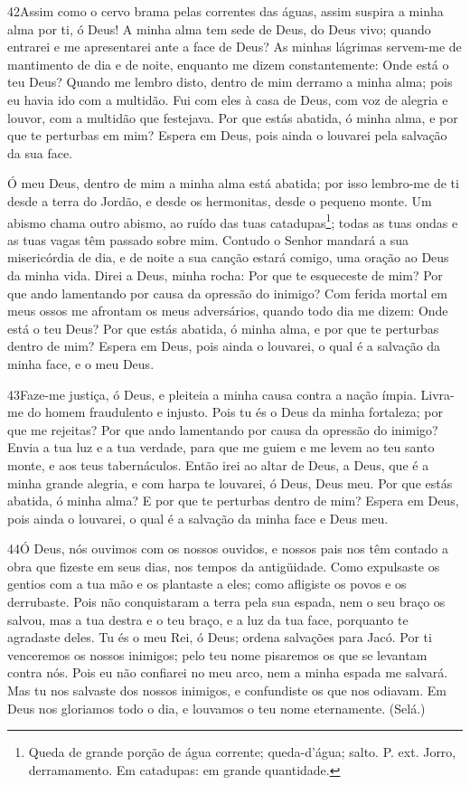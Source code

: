 \bigskip

\lettrine{42}{}Assim como o cervo brama pelas correntes das
águas, assim suspira a minha alma por ti, ó Deus! A minha alma
tem sede de Deus, do Deus vivo; quando entrarei e me apresentarei
ante a face de Deus? As minhas lágrimas servem-me de mantimento
de dia e de noite, enquanto me dizem constantemente: Onde está o teu
Deus? Quando me lembro disto, dentro de mim derramo a minha
alma; pois eu havia ido com a multidão. Fui com eles à casa de Deus,
com voz de alegria e louvor, com a multidão que festejava. Por
que estás abatida, ó minha alma, e por que te perturbas em mim?
Espera em Deus, pois ainda o louvarei pela salvação da sua face.

Ó meu Deus, dentro de mim a minha alma está abatida; por isso
lembro-me de ti desde a terra do Jordão, e desde os hermonitas,
desde o pequeno monte. Um abismo chama outro abismo, ao ruído
das tuas catadupas\footnote{Queda de grande porção de água corrente;
queda-d'água; salto. P. ext. Jorro, derramamento. Em catadupas: em
grande quantidade.}; todas as tuas ondas e as tuas vagas têm passado
sobre mim. Contudo o Senhor mandará a sua misericórdia de dia, e
de noite a sua canção estará comigo, uma oração ao Deus da minha
vida. Direi a Deus, minha rocha: Por que te esqueceste de mim?
Por que ando lamentando por causa da opressão do inimigo? Com
ferida mortal em meus ossos me afrontam os meus adversários, quando
todo dia me dizem: Onde está o teu Deus? Por que estás
abatida, ó minha alma, e por que te perturbas dentro de mim? Espera
em Deus, pois ainda o louvarei, o qual é a salvação da minha face, e
o meu Deus.

\bigskip

\lettrine{43}{}Faze-me justiça, ó Deus, e pleiteia a minha
causa contra a nação ímpia. Livra-me do homem fraudulento e injusto.
Pois tu és o Deus da minha fortaleza; por que me rejeitas? Por
que ando lamentando por causa da opressão do inimigo? Envia a
tua luz e a tua verdade, para que me guiem e me levem ao teu santo
monte, e aos teus tabernáculos. Então irei ao altar de Deus, a
Deus, que é a minha grande alegria, e com harpa te louvarei, ó Deus,
Deus meu. Por que estás abatida, ó minha alma? E por que te
perturbas dentro de mim? Espera em Deus, pois ainda o louvarei, o
qual é a salvação da minha face e Deus meu.

\bigskip

\lettrine{44}{}Ó Deus, nós ouvimos com os nossos ouvidos, e
nossos pais nos têm contado a obra que fizeste em seus dias, nos
tempos da antigüidade. Como expulsaste os gentios com a tua mão
e os plantaste a eles; como afligiste os povos e os derrubaste.
Pois não conquistaram a terra pela sua espada, nem o seu braço
os salvou, mas a tua destra e o teu braço, e a luz da tua face,
porquanto te agradaste deles. Tu és o meu Rei, ó Deus; ordena
salvações para Jacó. Por ti venceremos os nossos inimigos; pelo
teu nome pisaremos os que se levantam contra nós. Pois eu não
confiarei no meu arco, nem a minha espada me salvará. Mas tu nos
salvaste dos nossos inimigos, e confundiste os que nos odiavam.
Em Deus nos gloriamos todo o dia, e louvamos o teu nome
eternamente. (Selá.)

